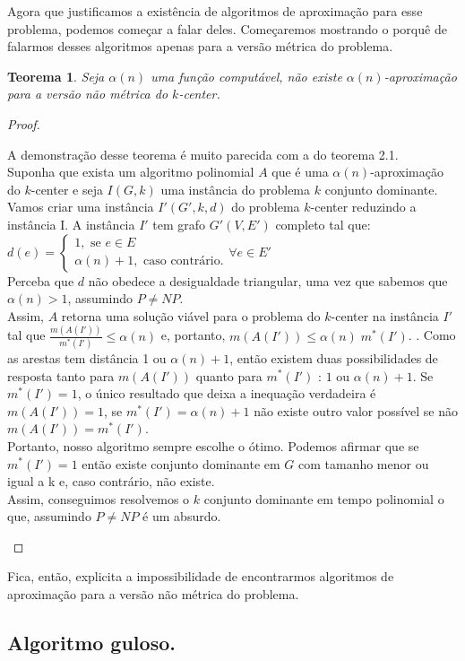 \documentclass[12pt]{article}
\newtheorem{theorem}{Teorema}[section]
\newcommand{\NP}{\mathit{NP}}
\newcommand{\red}[1]{{\color{red}{#1}}}
\begin{document}
Agora que justificamos a existência de algoritmos de aproximação para esse problema, podemos começar a falar deles. Começaremos mostrando o porquê de falarmos desses algoritmos apenas para a versão métrica do problema.
\begin{theorem}
    Seja $\alpha(n)$ uma função computável, não existe $\alpha(n)$-aproximação para a versão não métrica do $k$-center.
\end{theorem}

\begin{proof}
    \begin{it}
        A demonstração desse teorema é muito parecida com a do teorema 2.1. \\
        Suponha que exista um algoritmo polinomial $A$ que é uma $\alpha(n)$-aproximação do $k$-center e seja $I(G,k)$ uma instância do problema $k$ conjunto dominante. Vamos criar uma instância $I'(G',k,d)$ do problema $k$-center reduzindo a instância I. A instância $I'$ tem grafo $G'(V,E')$ completo tal que: \\

    $d(e) = \begin{cases}
            1, \text{ se } e \in E \\
            \alpha(n)+1, \text{ caso contrário.} 
            \end{cases}
            \forall e \in E'$\\
    Perceba que $d$ não obedece a desigualdade triangular, uma vez que sabemos que $\alpha(n) > 1$, assumindo $P \not= \NP$.  \\
    Assim, $A$ retorna uma solução viável para o problema do $k$-center na instância $I'$ tal que $\frac{m(A(I'))}{m^*(I')} \leq \alpha(n)$ e, portanto, $m(A(I')) \leq \alpha(n) \; m^*(I')$. \red{definir a função m junto com as outras definições no começo}.
    Como as arestas tem distância 1 ou $\alpha(n)+1$, então existem duas possibilidades de resposta tanto para $m(A(I'))$ quanto para $m^*(I')$ : $1$ ou $\alpha(n) + 1$. Se $m^*(I') = 1$, o único resultado que deixa a inequação verdadeira é $m(A(I'))=1$, se $m^*(I')=\alpha(n)+1$ não existe outro valor possível se não $m(A(I'))=m^*(I')$. \\
    Portanto, nosso algoritmo sempre escolhe o ótimo. Podemos afirmar que se $m^*(I') = 1$ então existe conjunto dominante em $G$ com tamanho menor ou igual a k e, caso contrário, não existe. \\
    Assim, conseguimos resolvemos o $k$ conjunto dominante em tempo polinomial o que, assumindo $P \not= \NP$ é um absurdo.
    \end{it}
\end{proof}
    Fica, então, explicita a impossibilidade de encontrarmos algoritmos de aproximação para a versão não métrica do problema. 
    
\subsection{Algoritmo guloso.}
    
\newpage


\end{document}
